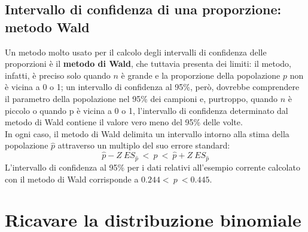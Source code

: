 \documentclass[drafts, 10pt]{book}
\newcounter{example}[section]
\begin{document}
\begin{example}
    \subsection{Intervallo di confidenza di una proporzione: metodo Wald}
    Un metodo molto usato per il calcolo degli intervalli di confidenza delle proporzioni è il \textbf{metodo di Wald}, che tuttavia presenta dei limiti: il metodo, infatti, è preciso solo quando $n$ è grande e la proporzione della popolazione $p$ non è vicina a 0 o 1; un intervallo di confidenza al 95\%, però, dovrebbe comprendere il parametro della popolazione nel 95\% dei campioni e, purtroppo, quando $n$ è piccolo o quando p è vicina a 0 o 1, l'intervallo di confidenza determinato dal metodo di Wald contiene il valore vero meno del 95\% delle volte.
    \\
    In ogni caso, il metodo di Wald delimita un intervallo intorno alla stima della popolazione $\hat{p}$ attraverso un multiplo del suo errore standard:
    \begin{equation}
    \hat{p} - Z \ ES_{\hat{p}} \ < \ p \ < \ \hat{p} + Z \ ES_{\hat{p}}
    \end{equation}
    L'intervallo di confidenza al 95\% per i dati relativi all'esempio corrente calcolato con il metodo di Wald corrisponde a $0.244 < \ p \ < 0.445$.
\end{example}

\section{Ricavare la distribuzione binomiale}
\end{document}
